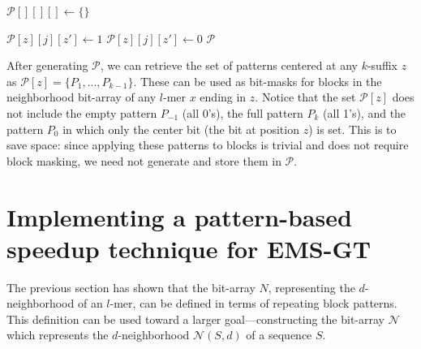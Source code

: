 \documentclass[oneside,12pt]{DISCSthesis}
\begin{document}
{\begin{enumerate}
{\begin{algorithmic}[1]
				\State $\mathcal{P}[][][] \leftarrow \{\}$ \hspace*{90pt}

					\State $\mathcal{P}[z][j][z'] \leftarrow 1$
				\Else
					\State $\mathcal{P}[z][j][z'] \leftarrow 0$
				\EndIf\EndFor\EndFor\EndFor
				\State\Return $\mathcal{P}$
				\end{algorithmic}
			}
			\bigskip
			\noindent After generating $\mathcal{P}$, we can retrieve the set of patterns centered at any $k$-suffix $z$ as $\mathcal{P}[z] = \{P_{1},...,P_{k-1}\}$. These can be used as bit-masks for blocks in the neighborhood bit-array of any $l$-mer $x$ ending in $z$. Notice that the set $\mathcal{P}[z]$ does not include the empty pattern $P_{-1}$ (all 0's), the full pattern $P_{k}$ (all 1's), and the pattern $P_{0}$ in which only the center bit (the bit at position $z$) is set. This is to save space: since applying these patterns to blocks is trivial and does not require block masking, we need not generate and store them in $\mathcal{P}$.
		\end{enumerate}

	\newpage
	\section{Implementing a pattern-based speedup technique for EMS-GT}
		The previous section has shown that the bit-array $N$, representing the $d$-neighborhood of an $l$-mer, can be defined in terms of repeating block patterns. This definition can be used toward a larger goal---constructing the bit-array $\mathcal{N}$ which represents the $d$-neighborhood $\mathcal{N}(S,d)$ of a sequence $S$.

}
\end{document}

